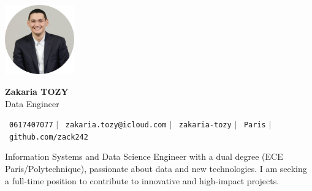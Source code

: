 \documentclass[11pt,a4paper]{article}
\begin{document}
\begin{flushleft}
  \begin{minipage}[c]{0.2\textwidth}
    \includegraphics[width=3cm]{images/profilpicture.png}
  \end{minipage}%
  \begin{minipage}[c]{0.8\textwidth}
    \hspace{10pt}
    {\huge \textbf{Zakaria TOZY}} \\ \vspace{10pt}
    \hspace{9pt}
    {\normalsize Data Engineer} \vspace{2pt}
  \end{minipage}
\end{flushleft}

\vspace{-5pt}

\begin{center}
    \small \faPhone\ \texttt{0617407077} \hspace{1pt} $|$
    \hspace{1pt} \faEnvelope\ \texttt{zakaria.tozy@icloud.com} \hspace{1pt} $|$
    \hspace{1pt} \faLinkedin\ \texttt{zakaria-tozy} \hspace{1pt} $|$
    \hspace{1pt} \faMapMarker\ \texttt{Paris} \hspace{1pt} $|$
    \hspace{1pt} \faGithub\ \texttt{github.com/zack242} \\ \vspace{0pt}
\end{center}

\begin{itemize}[leftmargin=0in, label={}]
\footnotesize{\item{
Information Systems and Data Science Engineer with a dual degree (ECE Paris/Polytechnique), passionate about data and new technologies. I am seeking a full-time position to contribute to innovative and high-impact projects.
}}
\end{itemize}
\end{document}
